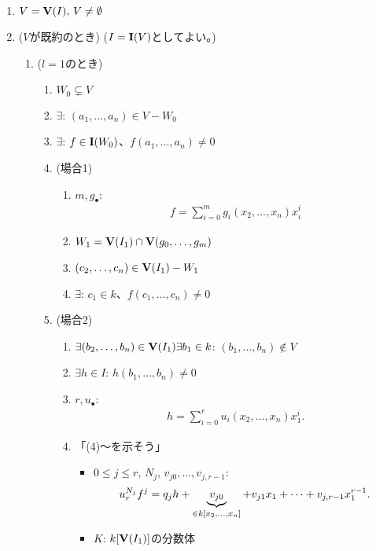 \label{sec:多様体上の多項式関数と有理関数}


\begin{enumerate}
  \item $V=\textbf V(I),\, V\neq \emptyset$
  \item
  ($V$が既約のとき) ($I=\textbf I(V)$としてよい。)
  \begin{enumerate}
    \item ($l=1$のとき)
  \begin{enumerate}
    \item $W_0 \subsetneq V$
    \item $\exists$: $(a_1,\dots,a_n) \in V-W_0$
    \item $\exists$: $f\in \textbf I(W_0)$、$f(a_1,\dots,a_n) \neq 0$
    \item (場合1)
    \begin{enumerate}
      \item $m,g_\bullet$:
      \begin{align}
        f=\sum_{i=0}^m g_i(x_2,\dots,x_n) x_i^i
      \end{align}
      \item $W_1 = \textbf V(I_1)\cap \textbf V(g_0,\dots,g_m)$
      \item $(c_2,\dots,c_n) \in \textbf V(I_1)-W_1$
      \item $\exists$: $c_1 \in k$、$f(c_1,\dots,c_n) \neq 0$
    \end{enumerate}
    \item (場合2)
    \begin{enumerate}
      \item $\exists (b_2,\dots,b_n) \in \textbf V(I_1) \exists b_1 \in k$:
      $(b_1,\dots,b_n) \notin V$
      \item $\exists h\in I$: $h(b_1,\dots,b_n) \neq 0$
      \item $r, u_\bullet$:
      \begin{align}
        h=\sum_{i=0}^r u_i(x_2,\dots,x_n) x_1^i.
      \end{align}
      \item 「(4)～を示そう」
      \begin{itemize}
        \item $0\le j\le r,\, N_j,\, v_{j0},\dots, v_{j,r-1}$:
        \begin{align}
          u_r^{N_j}f^j =
          q_j h + \underbrace{v_{j0}}_{\in k[x_2,\dots,x_n]} + v_{j1}x_1  + \dots + v_{j,r-1}x_1^{r-1}.
        \end{align}
        \item $K$: $k[\textbf V(I_1)]$の分数体

\end{itemize}
\end{enumerate}
\end{enumerate}
\end{enumerate}
\end{enumerate}
